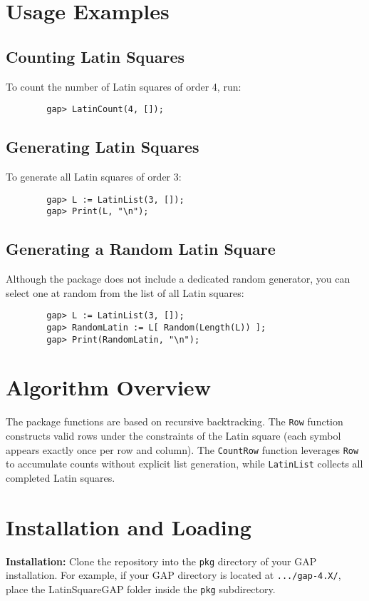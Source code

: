 \documentclass{report}
\begin{document}
	\chapter{Usage Examples}
	\section{Counting Latin Squares}
	To count the number of Latin squares of order 4, run:
	\begin{lstlisting}
		gap> LatinCount(4, []);
	\end{lstlisting}
	
	\section{Generating Latin Squares}
	To generate all Latin squares of order 3:
	\begin{lstlisting}
		gap> L := LatinList(3, []);
		gap> Print(L, "\n");
	\end{lstlisting}
	
	\section{Generating a Random Latin Square}
	Although the package does not include a dedicated random generator, you can select one at random from the list of all Latin squares:
	\begin{lstlisting}
		gap> L := LatinList(3, []);
		gap> RandomLatin := L[ Random(Length(L)) ];
		gap> Print(RandomLatin, "\n");
	\end{lstlisting}
	
	\chapter{Algorithm Overview}
	The package functions are based on recursive backtracking. The \texttt{Row} function constructs valid rows under the constraints of the Latin square (each symbol appears exactly once per row and column). The \texttt{CountRow} function leverages \texttt{Row} to accumulate counts without explicit list generation, while \texttt{LatinList} collects all completed Latin squares.
	
	\chapter{Installation and Loading}
	\textbf{Installation:}  
	Clone the repository into the \texttt{pkg} directory of your GAP installation. For example, if your GAP directory is located at \texttt{.../gap-4.X/}, place the LatinSquareGAP folder inside the \texttt{pkg} subdirectory.
	
\end{document}
